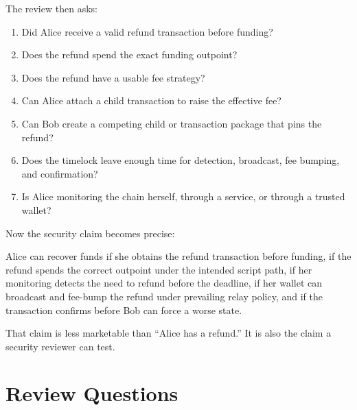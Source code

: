 The review then asks:

\begin{enumerate}
\item Did Alice receive a valid refund transaction before funding?
\item Does the refund spend the exact funding outpoint?
\item Does the refund have a usable fee strategy?
\item Can Alice attach a child transaction to raise the effective fee?
\item Can Bob create a competing child or transaction package that pins the refund?
\item Does the timelock leave enough time for detection, broadcast, fee bumping, and confirmation?
\item Is Alice monitoring the chain herself, through a service, or through a trusted wallet?
\end{enumerate}

Now the security claim becomes precise:

\begin{securitymodelbox}
Alice can recover funds if she obtains the refund transaction before funding, if the refund spends the correct outpoint under the intended script path, if her monitoring detects the need to refund before the deadline, if her wallet can broadcast and fee-bump the refund under prevailing relay policy, and if the transaction confirms before Bob can force a worse state.
\end{securitymodelbox}

That claim is less marketable than ``Alice has a refund.'' It is also the claim a security reviewer can test.

\section*{Review Questions}

